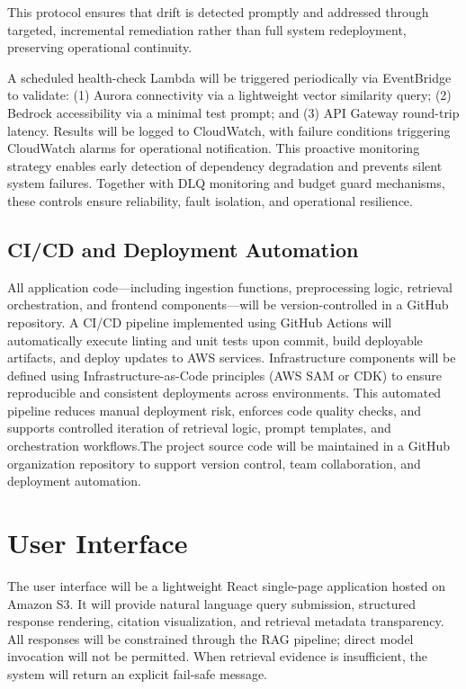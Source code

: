\documentclass[12pt,a4paper]{report}
\begin{document}
This protocol ensures that drift is detected promptly and addressed through targeted, incremental remediation rather than full system redeployment, preserving operational continuity.

A scheduled health-check Lambda will be triggered periodically via EventBridge to validate: (1) Aurora connectivity via a lightweight vector similarity query; (2) Bedrock accessibility via a minimal test prompt; and (3) API Gateway round-trip latency. Results will be logged to CloudWatch, with failure conditions triggering CloudWatch alarms for operational notification. This proactive monitoring strategy enables early detection of dependency degradation and prevents silent system failures. Together with DLQ monitoring and budget guard mechanisms, these controls ensure reliability, fault isolation, and operational resilience.

\subsection{CI/CD and Deployment Automation}

All application code—including ingestion functions, preprocessing logic, retrieval orchestration, and frontend components—will be version-controlled in a GitHub repository. A CI/CD pipeline implemented using GitHub Actions will automatically execute linting and unit tests upon commit, build deployable artifacts, and deploy updates to AWS services. Infrastructure components will be defined using Infrastructure-as-Code principles (AWS SAM or CDK) to ensure reproducible and consistent deployments across environments. This automated pipeline reduces manual deployment risk, enforces code quality checks, and supports controlled iteration of retrieval logic, prompt templates, and orchestration workflows.The project source code will be maintained in a GitHub organization repository to support version control, team collaboration, and deployment automation.

\section{User Interface}
\label{sec:ui}

The user interface will be a lightweight React single-page application hosted on Amazon S3. It will provide natural language query submission, structured response rendering, citation visualization, and retrieval metadata transparency. All responses will be constrained through the RAG pipeline; direct model invocation will not be permitted. When retrieval evidence is insufficient, the system will return an explicit fail-safe message.
\end{document}
